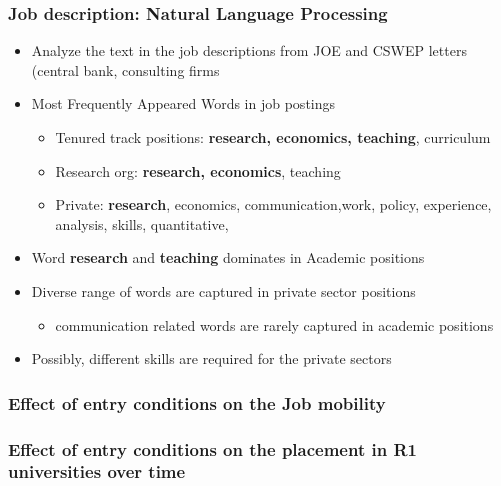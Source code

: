 \documentclass[11pt]{beamer}
\begin{document}
\begin{frame}[label = NLP]
	\frametitle{Job description: Natural Language Processing}
	\begin{itemize}
		\item Analyze the text in the job descriptions from JOE and CSWEP letters (central bank, consulting firms
		\item Most Frequently Appeared Words in job postings
		\begin{itemize}
			\item Tenured track positions: \textbf{research, economics, teaching}, curriculum
			\item Research org: \textbf{research, economics}, teaching
			\item Private: \textbf{research}, economics, communication,work, policy, experience, analysis, skills, quantitative, 
		\end{itemize}
		
		\item Word \textbf{research} and \textbf{teaching} dominates in Academic positions
		\item Diverse range of words are captured in private sector positions
		\begin{itemize}
			\item communication related words are rarely captured in academic positions
		\end{itemize} 
		\item Possibly, different skills are required for the private sectors \hyperlink{Occupation}{}
	\end{itemize}
\end{frame}


{
	\begin{frame}[label = mobility]
		\frametitle{Effect of entry conditions on the Job mobility}
		
		\hyperlink{discussion}{}
	\end{frame}
}

{
	\begin{frame}[label = signal]
		\frametitle{Effect of entry conditions on the placement in R1 universities over time}
		
		\hyperlink{discussion}{}
	\end{frame}
}
\end{document}

